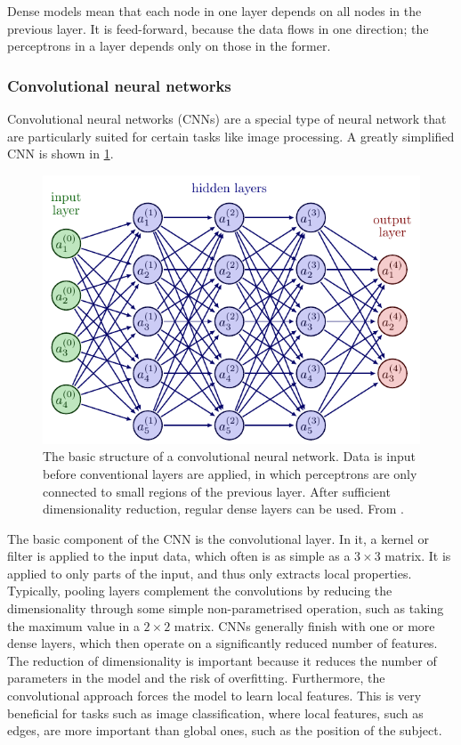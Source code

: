 Dense models mean that each node in one layer depends on all nodes in the previous layer.
It is feed-forward, because the data flows in one direction; the perceptrons in a layer depends only on those in the former.

\subsubsection{Convolutional neural networks}
Convolutional neural networks (CNNs) are a special type of neural network that are particularly suited for certain tasks like image processing.
A greatly simplified CNN is shown in \cref{fig:cnn}.

\begin{figure}
    \centering
    \includegraphics[width=0.75\linewidth, page=7]{neural_networks.pdf}
    \caption{
        The basic structure of a convolutional neural network.
        Data is input before conventional layers are applied, in which perceptrons are only connected to small regions of the previous layer.
        After sufficient dimensionality reduction, regular dense layers can be used.
        From \cite{nn_figs}.
    }
    \label{fig:cnn}
\end{figure}

The basic component of the CNN is the convolutional layer.
In it, a kernel or filter is applied to the input data, which often is as simple as a $3 \times 3$ matrix.
It is applied to only parts of the input, and thus only extracts local properties.
Typically, pooling layers complement the convolutions by reducing the dimensionality through some simple non-parametrised operation, such as taking the maximum value in a $2 \times 2$ matrix.
CNNs generally finish with one or more dense layers, which then operate on a significantly reduced number of features.
The reduction of dimensionality is important because it reduces the number of parameters in the model and the risk of overfitting.
Furthermore, the convolutional approach forces the model to learn local features.
This is very beneficial for tasks such as image classification, where local features, such as edges, are more important than global ones, such as the position of the subject.


